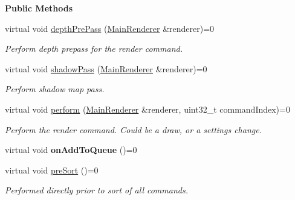 \begin{Indent}\textbf{ Public Methods}\par
\begin{DoxyCompactItemize}
\item 
\mbox{\label{classrev_1_1_render_command_a5c840fe6d9a87abaea65e93e42c78db3}} 
virtual void \mbox{\hyperlink{classrev_1_1_render_command_a5c840fe6d9a87abaea65e93e42c78db3}{depth\+Pre\+Pass}} (\mbox{\hyperlink{classrev_1_1_main_renderer}{Main\+Renderer}} \&renderer)=0
\begin{DoxyCompactList}\small\item\em Perform depth prepass for the render command. \end{DoxyCompactList}\item 
\mbox{\label{classrev_1_1_render_command_a2bc0f51854baf56605d0e79f66053565}} 
virtual void \mbox{\hyperlink{classrev_1_1_render_command_a2bc0f51854baf56605d0e79f66053565}{shadow\+Pass}} (\mbox{\hyperlink{classrev_1_1_main_renderer}{Main\+Renderer}} \&renderer)=0
\begin{DoxyCompactList}\small\item\em Perform shadow map pass. \end{DoxyCompactList}\item 
\mbox{\label{classrev_1_1_render_command_a9a4221b6535367f3a9907b28e93b033c}} 
virtual void \mbox{\hyperlink{classrev_1_1_render_command_a9a4221b6535367f3a9907b28e93b033c}{perform}} (\mbox{\hyperlink{classrev_1_1_main_renderer}{Main\+Renderer}} \&renderer, uint32\+\_\+t command\+Index)=0
\begin{DoxyCompactList}\small\item\em Perform the render command. Could be a draw, or a settings change. \end{DoxyCompactList}\item 
\mbox{\label{classrev_1_1_render_command_add03631d0f9b6bbf742355b0fd53f769}} 
virtual void {\bfseries on\+Add\+To\+Queue} ()=0
\item 
\mbox{\label{classrev_1_1_render_command_a64f689717624b99485e0267af282314a}} 
virtual void \mbox{\hyperlink{classrev_1_1_render_command_a64f689717624b99485e0267af282314a}{pre\+Sort}} ()=0
\begin{DoxyCompactList}\small\item\em Performed directly prior to sort of all commands. \end{DoxyCompactList}\end{DoxyCompactItemize}
\end{Indent}
